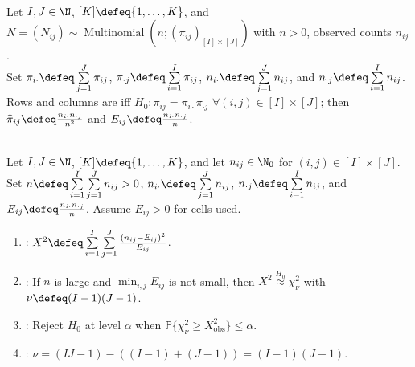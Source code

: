 \begin{definition} \label{def:chi-square-test-of-independence} \\
Let $I,J\in\N$, $[K]\defeq\{1,\ldots,K\}$, and $N=(N_{ij})\sim\operatorname{Multinomial}(n;(\pi_{ij})_{[I]\times[J]})$ with $n>0$, observed counts $n_{ij}$.\\
Set $\pi_{i\cdot}\defeq\sum\limits_{j=1}^{J}\pi_{ij}$, $\pi_{\cdot j}\defeq\sum\limits_{i=1}^{I}\pi_{ij}$, $n_{i\cdot}\defeq\sum\limits_{j=1}^{J}n_{ij}$, and $n_{\cdot j}\defeq\sum\limits_{i=1}^{I}n_{ij}$.\\
Rows and columns are  iff $H_0:\pi_{ij}=\pi_{i\cdot}\pi_{\cdot j}$ $\forall(i,j)\in[I]\times[J]$; then $\widehat{\pi}_{ij}\defeq\frac{n_{i\cdot}n_{\cdot j}}{n^2}$ and $E_{ij}\defeq\frac{n_{i\cdot}n_{\cdot j}}{n}$.
\end{definition}

\begin{method} \label{meth:pearson-independence-test} \\
Let $I,J\in\N$, $[K]\defeq\{1,\ldots,K\}$, and let $n_{ij}\in\N_0$ for $(i,j)\in[I]\times[J]$.\\
Set $n\defeq\sum\limits_{i=1}^{I}\sum\limits_{j=1}^{J}n_{ij}>0$, $n_{i\cdot}\defeq\sum\limits_{j=1}^{J}n_{ij}$, $n_{\cdot j}\defeq\sum\limits_{i=1}^{I}n_{ij}$, and $E_{ij}\defeq\frac{n_{i\cdot}n_{\cdot j}}{n}$. Assume $E_{ij}>0$ for cells used.
\begin{enumerate}[label=(\roman*)]
\setlength{\itemsep}{0pt}
\item {}: $X^2\defeq\sum\limits_{i=1}^{I}\sum\limits_{j=1}^{J}\frac{(n_{ij}-E_{ij})^2}{E_{ij}}$.
\item {}: If $n$ is large and $\min_{i,j}E_{ij}$ is not small, then $X^2\overset{H_0}{\approx}\chi^2_{\nu}$ with $\nu\defeq(I-1)(J-1)$.
\item {}: Reject $H_0$ at level $\alpha$ when $\mathbb{P}\{\chi^2_{\nu}\geq X^2_{\mathrm{obs}}\}\leq\alpha$.
\item {}: $\nu=(IJ-1)-((I-1)+(J-1))=(I-1)(J-1)$.
\end{enumerate}
\end{method}

